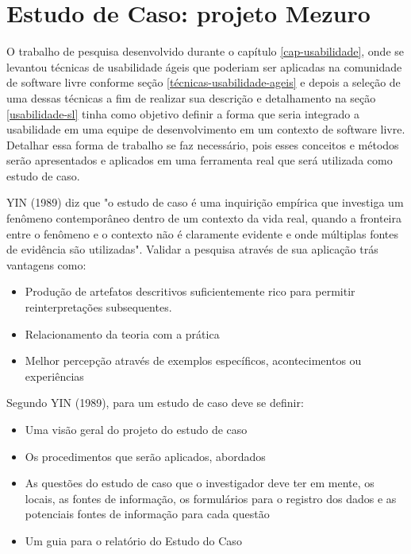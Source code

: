 \chapter{Estudo de Caso: projeto Mezuro}
\label{cap-estudo-caso}

O trabalho de pesquisa desenvolvido durante o capítulo \ref{cap-usabilidade}, onde se levantou técnicas de usabilidade ágeis que poderiam ser aplicadas na comunidade de software livre conforme seção \ref{técnicas-usabilidade-ageis} e depois a seleção de uma dessas técnicas a fim de realizar sua descrição e detalhamento na seção \ref{usabilidade-sl} tinha como objetivo definir a forma que seria integrado a usabilidade em uma equipe de desenvolvimento em um contexto de software livre. Detalhar essa forma de trabalho se faz necessário, pois esses conceitos e métodos serão apresentados e aplicados em uma ferramenta real que será utilizada como estudo de caso.

%
YIN (1989)%
diz que "o estudo de caso é uma inquirição empírica que investiga um fenômeno contemporâneo dentro de um contexto da vida real, quando a fronteira entre o fenômeno e o contexto não é claramente evidente e onde múltiplas fontes de evidência são utilizadas".
Validar a pesquisa através de sua aplicação trás vantagens como:
\begin{itemize}
\item Produção de artefatos descritivos suficientemente rico para permitir reinterpretações subsequentes.
\item Relacionamento da teoria com a prática
\item Melhor percepção através de exemplos específicos, acontecimentos ou experiências
\end{itemize}

%
Segundo YIN (1989), para um estudo de caso deve se definir:
\begin{itemize}
\item Uma visão geral do projeto do estudo de caso
\item Os procedimentos que serão aplicados, abordados
\item As questões do estudo de caso que o investigador deve ter em mente, os locais, as fontes de informação, os formulários para o registro dos dados e as potenciais fontes de informação para cada questão
\item Um guia para o relatório do Estudo do Caso
\end{itemize}


